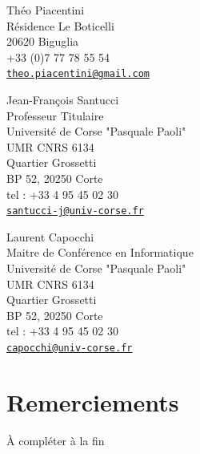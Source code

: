 \documentclass{rapport_stage}
\begin{document}
\maketitle
{}

\cleardoublepage

Théo Piacentini \\
Résidence Le Boticelli \\
20620 Biguglia \\
+33 (0)7 77 78 55 54 \\
\href{mailto:theo.piacentini@gmail.com}{\nolinkurl{theo.piacentini@gmail.com}}

\smallskip

Jean-François Santucci \\
Professeur Titulaire \\
Université de Corse "Pasquale Paoli"\\
UMR CNRS 6134\\
Quartier Grossetti\\
BP 52, 20250 Corte\\
tel : +33 4 95 45 02 30\\
\href{mailto:santucci-j@univ-corse.fr}{\nolinkurl{santucci-j@univ-corse.fr}}

\smallskip

Laurent Capocchi \\
Maitre de Conférence en Informatique \\
Université de Corse "Pasquale Paoli"\\
UMR CNRS 6134\\
Quartier Grossetti\\
BP 52, 20250 Corte\\
tel : +33 4 95 45 02 30\\
\href{mailto:capocchi@univ-corse.fr}{\nolinkurl{capocchi@univ-corse.fr}}

\cleardoublepage
{}
\section*{Remerciements}

{\color{green}
  À compléter à la fin
}

\clearpage
{}

\renewcommand{\baselinestretch}{0.5}\normalsize
\tableofcontents
\renewcommand{\baselinestretch}{1.0}\normalsize
\cleardoublepage

\setcounter{page}{1}
\end{document}
